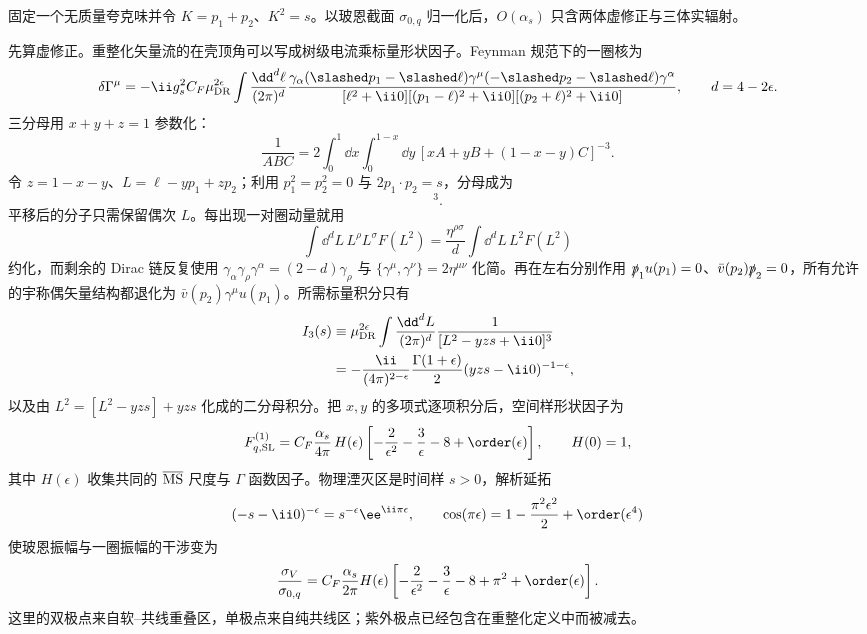 \begin{derivation}[强子产生率中的实虚抵消]
固定一个无质量夸克味并令 $K=p_1+p_2$、$K^2=s$。以玻恩截面 $\sigma_{0,q}$ 归一化后，$O(\alpha_s)$ 只含两体虚修正与三体实辐射。

先算虚修正。重整化矢量流的在壳顶角可以写成树级电流乘标量形状因子。Feynman 规范下的一圈核为
\begin{equation*}
 \delta\Gamma^\mu
 =-\ii g_s^2 C_F\mu_{\rm DR}^{2\epsilon}
 \int\frac{\dd^d\ell}{(2\pi)^d}
 \frac{\gamma_\alpha(\slashed p_1-\slashed\ell)\gamma^\mu
 (-\slashed p_2-\slashed\ell)\gamma^\alpha}
 {[\ell^2+\ii0][(p_1-\ell)^2+\ii0][(p_2+\ell)^2+\ii0]},
 \qquad d=4-2\epsilon .
\end{equation*}
三分母用 $x+y+z=1$ 参数化：
\begin{equation*}
 \frac1{ABC}
 =2\int_0^1\dd x\int_0^{1-x}\dd y\,
 [xA+yB+(1-x-y)C]^{-3}.
\end{equation*}
令 $z=1-x-y$、$L=\ell-yp_1+zp_2$；利用 $p_1^2=p_2^2=0$ 与 $2p_1\!\cdot p_2=s$，分母成为
\begin{equation*}
 [L^2-yzs+\ii0]^3.
\end{equation*}
平移后的分子只需保留偶次 $L$。每出现一对圈动量就用
\begin{equation*}
 \int\dd^dL\,L^\rho L^\sigma F(L^2)
 =\frac{\eta^{\rho\sigma}}d\int\dd^dL\,L^2F(L^2)
\end{equation*}
约化，而剩余的 Dirac 链反复使用 $\gamma_\alpha\gamma_\rho\gamma^\alpha=(2-d)\gamma_\rho$ 与 $\{\gamma^\mu,\gamma^\nu\}=2\eta^{\mu\nu}$ 化简。再在左右分别作用 $\slashed p_1u(p_1)=0$、$\bar v(p_2)\slashed p_2=0$，所有允许的宇称偶矢量结构都退化为 $\bar v(p_2)\gamma^\mu u(p_1)$。所需标量积分只有
\begin{align*}
 I_3(s)
 &\equiv\mu_{\rm DR}^{2\epsilon}
 \int\frac{\dd^dL}{(2\pi)^d}\frac1{[L^2-yzs+\ii0]^3}\\
 &=-\frac{\ii}{(4\pi)^{2-\epsilon}}
 \frac{\Gamma(1+\epsilon)}{2}
 (yzs-\ii0)^{-1-\epsilon},
\end{align*}
以及由 $L^2=[L^2-yzs]+yzs$ 化成的二分母积分。把 $x,y$ 的多项式逐项积分后，空间样形状因子为
\begin{equation*}
 F_{q,\rm SL}^{(1)}
 =C_F\frac{\alpha_s}{4\pi}\,H(\epsilon)
 \left[-\frac2{\epsilon^2}-\frac3\epsilon-8+\order(\epsilon)\right],
 \qquad H(0)=1,
\end{equation*}
其中 $H(\epsilon)$ 收集共同的 $\overline{\rm MS}$ 尺度与 $\Gamma$ 函数因子。物理湮灭区是时间样 $s>0$，解析延拓
\begin{equation*}
 (-s-\ii0)^{-\epsilon}=s^{-\epsilon}\ee^{\ii\pi\epsilon},
 \qquad
 \cos(\pi\epsilon)=1-\frac{\pi^2\epsilon^2}{2}+\order(\epsilon^4)
\end{equation*}
使玻恩振幅与一圈振幅的干涉变为
\begin{equation*}
 \frac{\sigma_V}{\sigma_{0,q}}
 =C_F\frac{\alpha_s}{2\pi}H(\epsilon)
 \left[-\frac2{\epsilon^2}-\frac3\epsilon-8+\pi^2+\order(\epsilon)\right].
\end{equation*}
这里的双极点来自软--共线重叠区，单极点来自纯共线区；紫外极点已经包含在重整化定义中而被减去。


\end{derivation}
